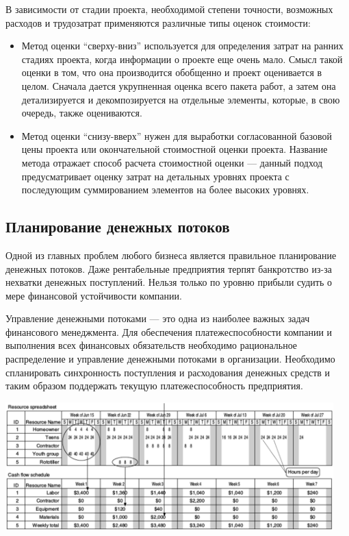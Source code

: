 \documentclass{../../text-style}
\begin{document}
В зависимости от стадии проекта, необходимой степени точности, возможных расходов и трудозатрат применяются различные типы оценок стоимости:
\begin{itemize}
    \item Метод оценки \enquote{сверху-вниз} используется для определения затрат на ранних стадиях проекта, когда информации о проекте еще очень мало. Смысл такой оценки в том, что она производится обобщенно и проект оценивается в целом. Сначала дается укрупненная оценка всего пакета работ, а затем она детализируется и декомпозируется на отдельные элементы, которые, в свою очередь, также оцениваются.
    \item Метод оценки \enquote{снизу-вверх} нужен для выработки согласованной базовой цены проекта или окончательной стоимостной оценки проекта. Название метода отражает способ расчета стоимостной оценки --- данный подход предусматривает оценку затрат на детальных уровнях проекта с последующим суммированием элементов на более высоких уровнях.
\end{itemize}

\subsection{Планирование денежных потоков}

Одной из главных проблем любого бизнеса является правильное планирование денежных потоков. Даже рентабельные предприятия терпят банкротство из-за нехватки денежных поступлений. Нельзя только по уровню прибыли судить о мере финансовой устойчивости компании.

Управление денежными потоками --- это одна из наиболее важных задач финансового менеджмента. Для обеспечения платежеспособности компании и выполнения всех финансовых обязательств необходимо рациональное распределение и управление денежными потоками в организации. Необходимо спланировать синхронность поступления и расходования денежных средств и таким образом поддержать текущую платежеспособность предприятия.

\begin{center}
    \includegraphics[width=0.95\textwidth]{cashFlow.png}
\end{center}
\end{document}
